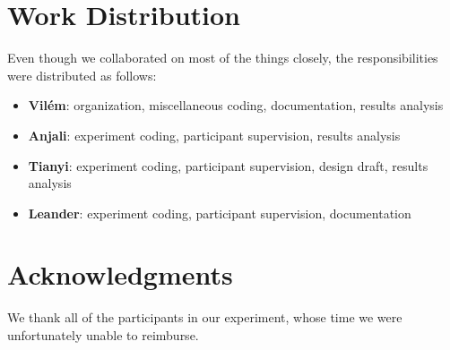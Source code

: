 \documentclass{sigchi}
\begin{document}
\vspace{-0.1cm}



\section{Work Distribution}

Even though we collaborated on most of the things closely, the responsibilities were distributed as follows:

\begin{itemize}[noitemsep]
\item \textbf{Vilém}: organization, miscellaneous coding, documentation, results analysis
\item \textbf{Anjali}: experiment coding, participant supervision, results analysis
\item \textbf{Tianyi}: experiment coding, participant supervision, design draft, results analysis
\item \textbf{Leander}: experiment coding, participant supervision, documentation
\end{itemize}

\vspace{0.3cm}

\section{Acknowledgments}

We thank all of the participants in our experiment, whose time we were unfortunately unable to reimburse.


\vspace{0.3cm}

%
%
%
%
%




\end{document}
